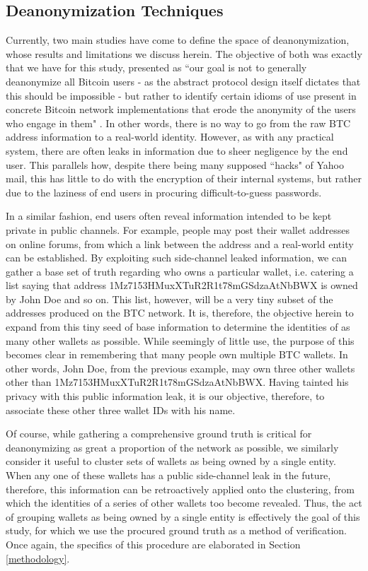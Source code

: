 \documentclass{article}
\begin{document}
\subsection{Deanonymization Techniques}
Currently, two main studies have come to define the space of deanonymization, whose results and limitations we discuss herein. The objective of both was exactly that we have for this study, presented as ``our goal is not to generally deanonymize all Bitcoin users - as the abstract protocol design itself dictates that this should be impossible - but rather to identify certain idioms of use present in concrete Bitcoin network implementations that erode the anonymity of the users who engage in them" \cite{fistful}. In other words, there is no way to go from the raw BTC address information to a real-world identity. However, as with any practical system, there are often leaks in information due to sheer negligence by the end user. This parallels how, despite there being many supposed ``hacks" of Yahoo mail, this has little to do with the encryption of their internal systems, but rather due to the laziness of end users in procuring difficult-to-guess passwords.

In a similar fashion, end users often reveal information intended to be kept private in public channels. For example, people may post their wallet addresses on online forums, from which a link between the address and a real-world entity can be established. By exploiting such side-channel leaked information, we can gather a base set of truth regarding who owns a particular wallet, i.e. catering a list saying that address 1Mz7153HMuxXTuR2R1t78mGSdzaAtNbBWX is owned by John Doe and so on. This list, however, will be a very tiny subset of the addresses produced on the BTC network. It is, therefore, the objective herein to expand from this tiny seed of base information to determine the identities of as many other wallets as possible. While seemingly of little use, the purpose of this becomes clear in remembering that many people own multiple BTC wallets. In other words, John Doe, from the previous example, may own three other wallets other than 1Mz7153HMuxXTuR2R1t78mGSdzaAtNbBWX. Having tainted his privacy with this public information leak, it is our objective, therefore, to associate these other three wallet IDs with his name.

Of course, while gathering a comprehensive ground truth is critical for deanonymizing as great a proportion of the network as possible, we similarly consider it useful to cluster sets of wallets as being owned by a single entity. When any one of these wallets has a public side-channel leak in the future, therefore, this information can be retroactively applied onto the clustering, from which the identities of a series of other wallets too become revealed. Thus, the act of grouping wallets as being owned by a single entity is effectively the goal of this study, for which we use the procured ground truth as a method of verification. Once again, the specifics of this procedure are elaborated in Section \ref{methodology}.
\end{document}
